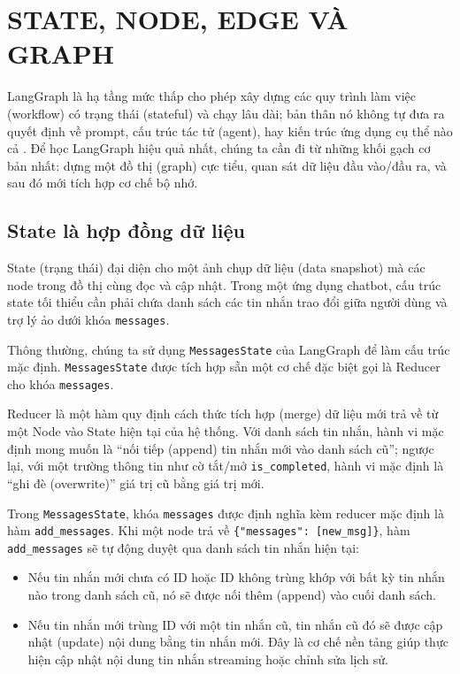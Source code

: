 \chapter{STATE, NODE, EDGE VÀ GRAPH}
\label{chap:langgraph-foundations}

LangGraph là hạ tầng mức thấp cho phép xây dựng các quy trình làm việc (workflow) có trạng thái (stateful) và chạy lâu dài; bản thân nó không tự đưa ra quyết định về prompt, cấu trúc tác tử (agent), hay kiến trúc ứng dụng cụ thể nào cả \parencite{langgraphOverview}. Để học LangGraph hiệu quả nhất, chúng ta cần đi từ những khối gạch cơ bản nhất: dựng một đồ thị (graph) cực tiểu, quan sát dữ liệu đầu vào/đầu ra, và sau đó mới tích hợp cơ chế bộ nhớ.

\section{State là hợp đồng dữ liệu}

State (trạng thái) đại diện cho một ảnh chụp dữ liệu (data snapshot) mà các node trong đồ thị cùng đọc và cập nhật. Trong một ứng dụng chatbot, cấu trúc state tối thiểu cần phải chứa danh sách các tin nhắn trao đổi giữa người dùng và trợ lý ảo dưới khóa \texttt{messages}. 

Thông thường, chúng ta sử dụng \texttt{MessagesState} của LangGraph để làm cấu trúc mặc định. \texttt{MessagesState} được tích hợp sẵn một cơ chế đặc biệt gọi là Reducer cho khóa \texttt{messages}.

\begin{aidefinition}[Reducer]
Reducer là một hàm quy định cách thức tích hợp (merge) dữ liệu mới trả về từ một Node vào State hiện tại của hệ thống. Với danh sách tin nhắn, hành vi mặc định mong muốn là ``nối tiếp (append) tin nhắn mới vào danh sách cũ''; ngược lại, với một trường thông tin như cờ tắt/mở \texttt{is\_completed}, hành vi mặc định là ``ghi đè (overwrite)'' giá trị cũ bằng giá trị mới.
\end{aidefinition}

Trong \texttt{MessagesState}, khóa \texttt{messages} được định nghĩa kèm reducer mặc định là hàm \texttt{add\_messages}. Khi một node trả về \texttt{\{"messages": [new\_msg]\}}, hàm \texttt{add\_messages} sẽ tự động duyệt qua danh sách tin nhắn hiện tại:
\begin{itemize}
  \item Nếu tin nhắn mới chưa có ID hoặc ID không trùng khớp với bất kỳ tin nhắn nào trong danh sách cũ, nó sẽ được nối thêm (append) vào cuối danh sách.
  \item Nếu tin nhắn mới trùng ID với một tin nhắn cũ, tin nhắn cũ đó sẽ được cập nhật (update) nội dung bằng tin nhắn mới. Đây là cơ chế nền tảng giúp thực hiện cập nhật nội dung tin nhắn streaming hoặc chỉnh sửa lịch sử.
\end{itemize}

